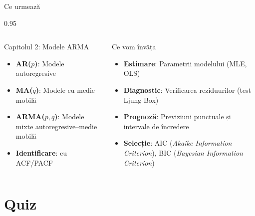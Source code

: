 \documentclass[9pt, aspectratio=169, t]{beamer}
\begin{document}
\begin{frame}{Ce urmează}
    \begin{cminipage}{0.95\textwidth}
        \begin{columns}[T]
            \begin{block}{Capitolul 2: Modele ARMA}
                \begin{itemize}\setlength{\itemsep}{0pt}
                    \item \textbf{AR($p$)}: Modele autoregresive
                    \item \textbf{MA($q$)}: Modele cu medie mobilă
                    \item \textbf{ARMA($p,q$)}: Modele mixte autoregresive--medie mobilă
                    \item \textbf{Identificare}: cu ACF/PACF
                \end{itemize}
            \end{block}
            \begin{exampleblock}{Ce vom învăța}
                \begin{itemize}\setlength{\itemsep}{0pt}
                    \item \textbf{Estimare}: Parametrii modelului (MLE, OLS)
                    \item \textbf{Diagnostic}: Verificarea reziduurilor (test Ljung-Box)
                    \item \textbf{Prognoză}: Previziuni punctuale și intervale de încredere
                    \item \textbf{Selecție}: AIC (\textit{Akaike Information Criterion}), BIC (\textit{Bayesian Information Criterion})
                \end{itemize}
            \end{exampleblock}
        \end{columns}
    \end{cminipage}
\end{frame}

\section{Quiz}
\end{document}
